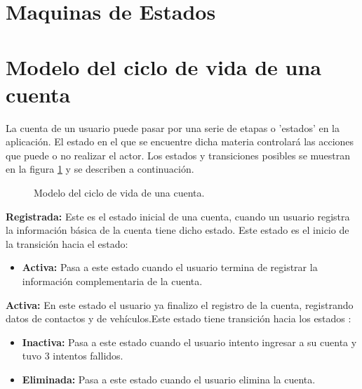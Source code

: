 \newpage
\section{Maquinas de Estados}

\hypertarget{cv:Cuenta}{\section{Modelo del ciclo de vida de una cuenta}}

La cuenta de un usuario puede pasar por una serie de etapas o 'estados' en la aplicación. El estado en el que se encuentre dicha materia controlará las acciones que puede o no realizar el actor. Los estados y transiciones posibles se muestran en la figura \ref{fig:maq:cuenta} y se describen a continuación.\\

\begin{figure}[htbp!]
	\centering
	\caption{Modelo del ciclo de vida de una cuenta.}
	\label{fig:maq:cuenta}
\end{figure}

\noindent \textbf{Registrada:} Este es el estado inicial de una cuenta, cuando un usuario registra la información básica de la cuenta tiene dicho estado. Este estado es el inicio de la transición hacia el estado:
\begin{itemize}
	
	\item \textbf{Activa:} Pasa a este estado cuando el usuario termina de registrar la información complementaria de la cuenta.
	
\end{itemize}

\noindent \textbf{Activa:} En este estado el usuario ya finalizo el registro de la cuenta, registrando datos de contactos y de vehículos.Este estado tiene transición hacia los estados :
\begin{itemize}
	
	\item \textbf{Inactiva:} Pasa a este estado cuando el usuario intento ingresar a su cuenta y tuvo 3 intentos fallidos.
	\item \textbf{Eliminada:} Pasa a este estado cuando el usuario elimina la cuenta. 
\end{itemize}

